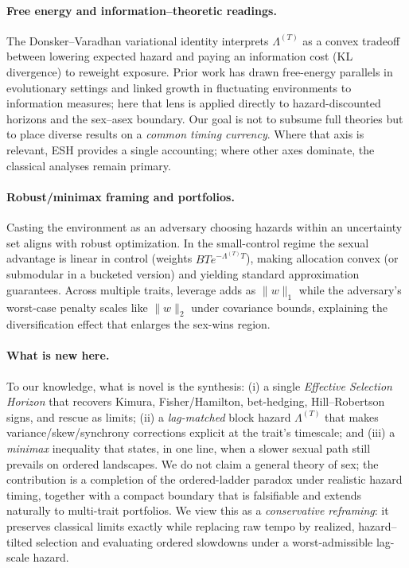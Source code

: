 \documentclass[11pt]{article}
\theoremstyle{upright}
\newcommand{\hazT}[1]{\Lambda^{(#1)}}          %
\begin{document}
\paragraph{Free energy and information--theoretic readings.}
The Donsker--Varadhan variational identity interprets $\hazT{T}$ as a convex tradeoff between lowering expected hazard and paying an information cost (KL divergence) to reweight exposure. Prior work has drawn free-energy parallels in evolutionary settings and linked growth in fluctuating environments to information measures; here that lens is applied directly to hazard-discounted horizons and the sex–asex boundary. Our goal is not to subsume full theories but to place diverse results on a \emph{common timing currency}. Where that axis is relevant, ESH provides a single accounting; where other axes dominate, the classical analyses remain primary.

\paragraph{Robust/minimax framing and portfolios.}
Casting the environment as an adversary choosing hazards within an uncertainty set aligns with robust optimization. In the small-control regime the sexual advantage is linear in control (weights $B T e^{-\hazT{T}T}$), making allocation convex (or submodular in a bucketed version) and yielding standard approximation guarantees. Across multiple traits, leverage adds as $\|w\|_1$ while the adversary’s worst-case penalty scales like $\|w\|_2$ under covariance bounds, explaining the diversification effect that enlarges the sex-wins region.

\paragraph{What is new here.}
To our knowledge, what is novel is the synthesis: (i) a single \emph{Effective Selection Horizon} that recovers Kimura, Fisher/Hamilton, bet-hedging, Hill–Robertson signs, and rescue as limits; (ii) a \emph{lag-matched} block hazard $\hazT{T}$ that makes variance/skew/synchrony corrections explicit at the trait’s timescale; and (iii) a \emph{minimax} inequality that states, in one line, when a slower sexual path still prevails on ordered landscapes. We do not claim a general theory of sex; the contribution is a completion of the ordered-ladder paradox under realistic hazard timing, together with a compact boundary that is falsifiable and extends naturally to multi-trait portfolios. We view this as a \emph{conservative reframing}: it preserves classical limits exactly while replacing raw tempo by realized, hazard–tilted selection and evaluating ordered slowdowns under a worst-admissible lag-scale hazard.
\end{document}
